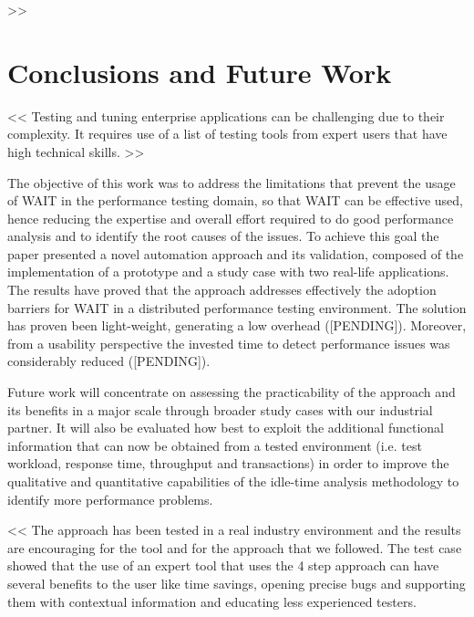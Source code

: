 \documentclass[runningheads,a4paper]{llncs}
\begin{document}
>>




\section{Conclusions and Future Work}

<<
Testing and tuning enterprise applications can be
challenging due to their complexity. It requires use of a list of testing tools from expert users that have high technical skills. 
>>

The objective of this work was to address the limitations that prevent the
usage of WAIT in the performance testing domain, so that WAIT can be
effective used, hence reducing the expertise and overall effort required to do
good performance analysis and to identify the root causes of the issues.
To achieve this goal the paper presented a novel automation approach and its
validation, composed of the implementation of a prototype and a study
case with two real-life applications. The results have proved that the approach 
addresses effectively the adoption barriers for WAIT in a distributed performance testing
environment. The solution has proven been light-weight, generating a low
overhead ([PENDING]). Moreover, from a usability perspective the invested time
to detect performance issues was considerably reduced ([PENDING]).

Future work will concentrate on assessing the practicability of the
approach and its benefits in a major scale through broader study cases with our
industrial partner. It will also be evaluated how best to exploit the additional
functional information that can now be obtained from a tested environment
(i.e. test workload, response time, throughput and transactions) in order to
improve the qualitative and quantitative capabilities of the idle-time
analysis methodology to identify more performance problems.


<<
The approach has been tested in a real industry environment and the results are encouraging for the tool and for the approach that we followed. 
The test case showed that the use of an expert tool that uses the 4 step approach can have several benefits to the user like time savings, opening 
precise bugs and supporting them with contextual information and educating less
experienced testers.
\end{document}
